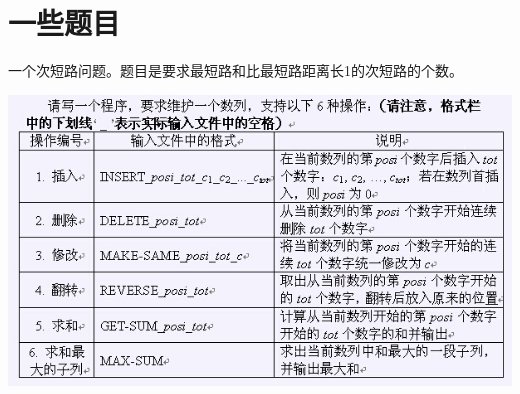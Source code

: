 \section{一些题目}











一个次短路问题。题目是要求最短路和比最短路距离长1的次短路的个数。


\begin{center}
\includegraphics[scale=1]{./模板/13_一些题目/5.jpg}
\end{center}

